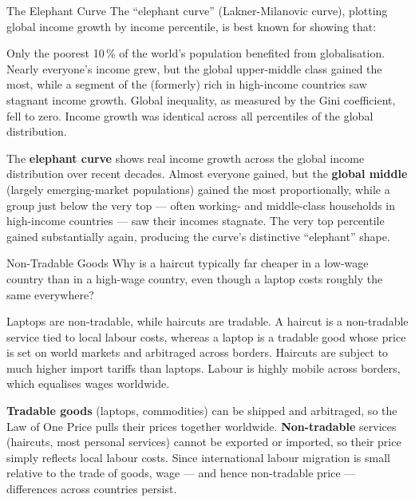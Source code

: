 \begin{question}[type=mc]{The Elephant Curve}
The ``elephant curve'' (Lakner-Milanovic curve), plotting global income
growth by income percentile, is best known for showing that:
\begin{choices}
  \choice        Only the poorest 10\,\% of the world's population benefited
                 from globalisation.
  \correctchoice Nearly everyone's income grew, but the global upper-middle
                 class gained the most, while a segment of the (formerly)
                 rich in high-income countries saw stagnant income growth.
  \choice        Global inequality, as measured by the Gini coefficient,
                 fell to zero.
  \choice        Income growth was identical across all percentiles of the
                 global distribution.
\end{choices}
\begin{solution}
  The \textbf{elephant curve} shows real income growth across the global
  income distribution over recent decades. Almost everyone gained, but the
  \textbf{global middle} (largely emerging-market populations) gained the
  most proportionally, while a group just below the very top --- often
  working- and middle-class households in high-income countries --- saw
  their incomes stagnate. The very top percentile gained substantially again,
  producing the curve's distinctive ``elephant'' shape.
\end{solution}
\end{question}

\begin{question}[type=mc]{Non-Tradable Goods}
Why is a haircut typically far cheaper in a low-wage country than in a
high-wage country, even though a laptop costs roughly the same everywhere?
\begin{choices}
  \choice        Laptops are non-tradable, while haircuts are tradable.
  \correctchoice A haircut is a non-tradable service tied to local labour
                 costs, whereas a laptop is a tradable good whose price is
                 set on world markets and arbitraged across borders.
  \choice        Haircuts are subject to much higher import tariffs than
                 laptops.
  \choice        Labour is highly mobile across borders, which equalises
                 wages worldwide.
\end{choices}
\begin{solution}
  \textbf{Tradable goods} (laptops, commodities) can be shipped and
  arbitraged, so the Law of One Price pulls their prices together worldwide.
  \textbf{Non-tradable} services (haircuts, most personal services) cannot
  be exported or imported, so their price simply reflects local labour
  costs. Since international labour migration is small relative to the
  trade of goods, wage --- and hence non-tradable price --- differences
  across countries persist.
\end{solution}
\end{question}


